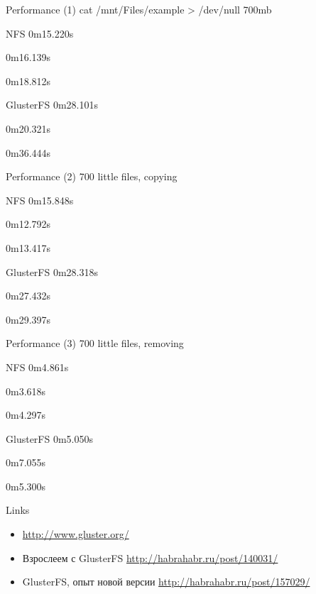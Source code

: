 \documentclass{beamer}
\begin{document}
\begin{frame}{Performance (1)}
	cat /mnt/Files/example > /dev/null
	700mb
	\begin{block}{NFS}
		0m15.220s

		0m16.139s
		
		0m18.812s
	\end{block}
	\begin{block}{GlusterFS}		
		0m28.101s

		0m20.321s

		0m36.444s
	\end{block}
\end{frame}

\begin{frame}{Performance (2)}
	700 little files, copying
	\begin{block}{NFS}
		0m15.848s

		0m12.792s

		0m13.417s
	\end{block}
	\begin{block}{GlusterFS}
		0m28.318s

		0m27.432s

		0m29.397s
	\end{block}
\end{frame}

\begin{frame}{Performance (3)}
	700 little files, removing
	\begin{block}{NFS}
		0m4.861s

		0m3.618s

		0m4.297s
	\end{block}
	\begin{block}{GlusterFS}
		0m5.050s

		0m7.055s

		0m5.300s
	\end{block}
\end{frame}

\begin{frame}{Links}
	\begin{itemize}
		\item \url{http://www.gluster.org/}
		\item Взрослеем с GlusterFS \url{http://habrahabr.ru/post/140031/}
		\item GlusterFS, опыт новой версии \url{http://habrahabr.ru/post/157029/}
	\end{itemize}
\end{frame}
\end{document}
